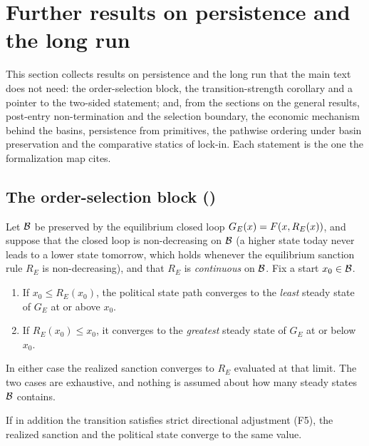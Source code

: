 \section{Further results on persistence and the long run}
\label{app:moved-ak}

This section collects results on persistence and the long run that the main text does
not need: the order-selection block, the transition-strength corollary and a pointer to the
two-sided statement; and, from the sections on the general results, post-entry non-termination and the selection
boundary, the economic mechanism behind the basins, persistence from primitives, the
pathwise ordering under basin preservation and the comparative statics of lock-in. Each
statement is the one the formalization map cites.

\subsection{The order-selection block ()}

\begin{proposition}
\label{prop:order-selection}
Let $\mathcal{B}$ be preserved by the equilibrium closed loop $G_E(x)=F(x,R_E(x))$,
and suppose that the closed loop is non-decreasing on $\mathcal{B}$ (a higher state
today never leads to a lower state tomorrow, which holds whenever the
equilibrium sanction rule $R_E$ is non-decreasing), and that $R_E$ is
\emph{continuous} on $\mathcal{B}$. Fix a start $x_0\in\mathcal{B}$.
\begin{enumerate}[label=(\roman*)]
\item If $x_0\le R_E(x_0)$, the political state path converges to the
  \emph{least} steady state of $G_E$ at or above $x_0$.
\item If $R_E(x_0)\le x_0$, it converges to the \emph{greatest} steady state of
  $G_E$ at or below $x_0$.
\end{enumerate}
In either case the realized sanction converges to $R_E$ evaluated at that limit.
The two cases are exhaustive, and nothing is assumed about how many steady states
$\mathcal{B}$ contains.
\end{proposition}

\begin{corollary}
\label{cor:order-selection-identified}
If in addition the transition satisfies strict directional adjustment
\textup{(F5)}, the realized sanction and the political state converge to the same
value.
\end{corollary}

